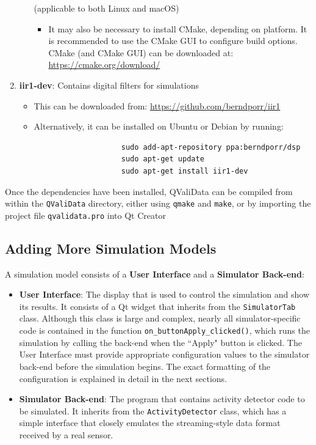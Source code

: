 \documentclass[]{article}
\begin{document}
\begin{enumerate}
\begin{itemize}
					(applicable to both Linux and macOS)
						\begin{itemize}
							\item It may also be necessary to install CMake, depending on platform. It is recommended to use the CMake GUI to configure build options. CMake (and CMake GUI) can be downloaded at: \href{https://cmake.org/download/}{https://cmake.org/download/}
						\end{itemize}
				\end{itemize}
			\item \textbf{iir1-dev}: Contains digital filters for simulations
				\begin{itemize}
					\item This can be downloaded from: \href{https://github.com/berndporr/iir1}{https://github.com/berndporr/iir1}
					\item Alternatively, it can be installed on Ubuntu or Debian by running:
					\begin{verbatim}
					sudo add-apt-repository ppa:berndporr/dsp
					sudo apt-get update
					sudo apt-get install iir1-dev
					\end{verbatim}
				\end{itemize}
		\end{enumerate}
		
		Once the dependencies have been installed, QValiData can be compiled from within the \texttt{QValiData} directory, either using \texttt{qmake} and \texttt{make}, or by importing the project file \texttt{qvalidata.pro} into Qt Creator
		
	\subsection{Adding More Simulation Models}
	A simulation model consists of a \textbf{User Interface} and a \textbf{Simulator Back-end}:
	\begin{itemize}
		\item \textbf{User Interface}: The display that is used to control the simulation and show its results. It consists of a Qt widget that inherits from the \texttt{SimulatorTab} class. Although this class is large and complex, nearly all simulator-specific code is contained in the function \texttt{on\_buttonApply\_clicked()}, which runs the simulation by calling the back-end when the ``Apply" button is clicked. The User Interface must provide appropriate configuration values to the simulator back-end before the simulation begins. The exact formatting of the configuration is explained in detail in the next sections.
		
		\item \textbf{Simulator Back-end}: The program that contains activity detector code to be simulated. It inherits from the \texttt{ActivityDetector} class, which has a simple interface that closely emulates the streaming-style data format received by a real sensor. 
	\end{itemize}
\end{document}
